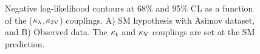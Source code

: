 \begin{figure}[ht!]
\captionsetup[subfigure]{justification=centering}
\centering
{}
\caption[Negative log-likelihood contours at 68\% and 95\% CL as a function of the ($\kl$,$\kvv$) couplings]{\label{fig:likelihood_c2V_kl_2D}Negative log-likelihood contours at 68\% and 95\% CL as a function of the ($\kl$,$\kvv$) couplings. A) SM hypothesis with Asimov dataset, and B) Observed data. The $\mathrm{\kappa_{t} }$ and $\mathrm{\kappa_{V} }$ couplings are set at the SM prediction.}
\end{figure}

